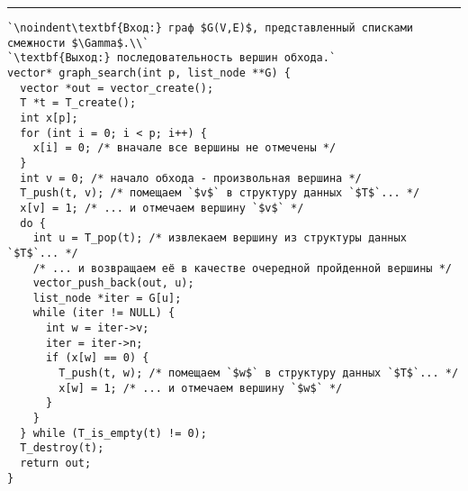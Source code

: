 \documentclass{article}
\begin{document}
\vspace{5pt} \hrule
\begin{lstlisting}[caption={Поиск в ширину и в глубину}, label=p258_graph_search, escapechar=`]
`\noindent\textbf{Вход:} граф $G(V,E)$, представленный списками смежности $\Gamma$.\\`
`\textbf{Выход:} последовательность вершин обхода.`
vector* graph_search(int p, list_node **G) {
  vector *out = vector_create();
  T *t = T_create();
  int x[p];
  for (int i = 0; i < p; i++) {
    x[i] = 0; /* вначале все вершины не отмечены */
  }
  int v = 0; /* начало обхода - произвольная вершина */
  T_push(t, v); /* помещаем `$v$` в структуру данных `$T$`... */
  x[v] = 1; /* ... и отмечаем вершину `$v$` */
  do {
    int u = T_pop(t); /* извлекаем вершину из структуры данных `$T$`... */
    /* ... и возвращаем её в качестве очередной пройденной вершины */
    vector_push_back(out, u);
    list_node *iter = G[u];
    while (iter != NULL) {
      int w = iter->v;
      iter = iter->n;
      if (x[w] == 0) {
        T_push(t, w); /* помещаем `$w$` в структуру данных `$T$`... */
        x[w] = 1; /* ... и отмечаем вершину `$w$` */
      }
    }
  } while (T_is_empty(t) != 0);
  T_destroy(t);
  return out;
}
\end{lstlisting}
\end{document}
